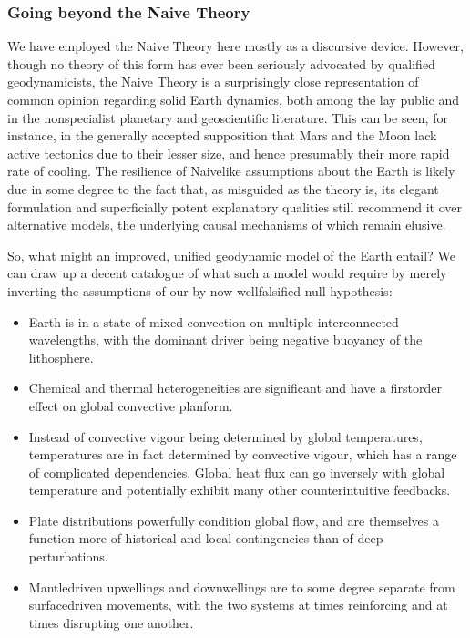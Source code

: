 \documentclass[letterpaper,10pt,english]{jupyterBook}
\begin{document}
\subsubsection{Going beyond the Naive Theory}
\label{\detokenize{content/chapter_01_background/main:going-beyond-the-naive-theory}}
\sphinxAtStartPar
We have employed the Naive Theory here mostly as a discursive device. However, though no theory of this form has ever been seriously advocated by qualified geodynamicists, the Naive Theory is a surprisingly close representation of common opinion regarding solid Earth dynamics, both among the lay public and in the non\sphinxhyphen{}specialist planetary and geoscientific literature. This can be seen, for instance, in the generally accepted supposition that Mars and the Moon lack active tectonics due to their lesser size, and hence \sphinxhyphen{} presumably \sphinxhyphen{} their more rapid rate of cooling. The resilience of Naive\sphinxhyphen{}like assumptions about the Earth is likely due in some degree to the fact that, as misguided as the theory is, its elegant formulation and superficially potent explanatory qualities still recommend it over alternative models, the underlying causal mechanisms of which remain elusive.

\sphinxAtStartPar
So, what might an improved, unified geodynamic model of the Earth entail? We can draw up a decent catalogue of what such a model would require by merely inverting the assumptions of our by now well\sphinxhyphen{}falsified null hypothesis:
\begin{itemize}
\item {} 
\sphinxAtStartPar
Earth is in a state of mixed convection on multiple interconnected wavelengths, with the dominant driver being negative buoyancy of the lithosphere.

\item {} 
\sphinxAtStartPar
Chemical and thermal heterogeneities are significant and have a first\sphinxhyphen{}order effect on global convective planform.

\item {} 
\sphinxAtStartPar
Instead of convective vigour being determined by global temperatures, temperatures are in fact determined by convective vigour, which has a range of complicated dependencies. Global heat flux can go inversely with global temperature and potentially exhibit many other counter\sphinxhyphen{}intuitive feedbacks.

\item {} 
\sphinxAtStartPar
Plate distributions powerfully condition global flow, and are themselves a function more of historical and local contingencies than of deep perturbations.

\item {} 
\sphinxAtStartPar
Mantle\sphinxhyphen{}driven upwellings and downwellings are to some degree separate from surface\sphinxhyphen{}driven movements, with the two systems at times reinforcing and at times disrupting one another.

\end{itemize}
\end{document}

